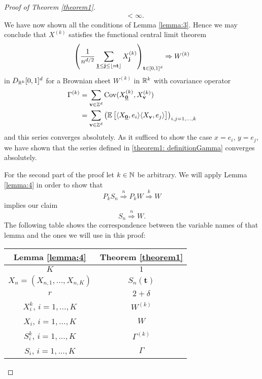 \begin{proof}[Proof of Theorem \ref{theorem1}]
\begin{align*}
        & < \infty.
    \end{align*}
    We have now shown all the conditions of Lemma \ref{lemma:3}. Hence we may conclude that $X^{(k)}$ satisfies the functional central limit theorem
    \[ \left( \frac{1}{n^{d/2}} \sum\limits_{\usbf[1] \leq \mathbf{j} \leq \floor{n \mathbf{t}}} X^{(k)}_\mathbf{j} \right)_{\mathbf{t} \in [0,1]^d} \Rightarrow W^{(k)} \]
    in $D_{\mathbb{R}^k}[0,1]^d$ for a Brownian sheet $W^{(k)}$ in $\mathbb{R}^k$ with covariance operator
    \begin{align*}
        \Gamma^{(k)}
        & = \sum\limits_{\mathbf{v} \in \ZZ^d} \Cov(X^{(k)}_{\usbf[0]}, X^{(k)}_{\mathbf{v}}) \\
        & = \sum\limits_{\mathbf{v} \in \ZZ^d} \left(\EE{\langle X_{\usbf[0]}, e_i \rangle \langle X_\mathbf{v}, e_j \rangle}\right)_{i,j=1, ..., k}
    \end{align*}
    and this series converges absolutely. As it sufficed to show the case $x = e_i$, $y = e_j$, we have shown that the series defined in \eqref{theorem1: definitionGamma} converges absolutely.

    For the second part of the proof let $k \in \mathbb{N}$ be arbitrary. We will apply Lemma \ref{lemma:4} in order to show that
    \[ P_k S_n \stackrel{n}{\Rightarrow} P_k W \stackrel{k}{\Rightarrow} W \]
    implies our claim
    \[ S_n \stackrel{n}{\Rightarrow} W. \]
    The following table shows the correspondence between the variable names of that lemma and the ones we will use in this proof:
    \begin{center}
        \begin{tabular}{|c | c|} 
         \hline
         Lemma \ref{lemma:4} & Theorem \ref{theorem1} \\ [0.5ex] 
         \hline\hline
         $K$ & $1$ \\ 
         \hline
         $X_n = (X_{n, 1}, ..., X_{n, K})$ & $S_n(\mathbf{t})$ \\
         \hline
         $r$ & $2+\delta$ \\
         \hline
         $X_i^k$, $i = 1, ..., K$ & $W^{(k)}$ \\ 
         \hline
         $X_i$, $i = 1, ..., K$ & $W$ \\ 
         \hline
         $S_i^k$, $i = 1, ..., K$ & $\Gamma^{(k)}$ \\ 
         \hline
         $S_i$, $i = 1, ..., K$ & $\Gamma$ \\  %
         \hline
        \end{tabular}
    \end{center}


\end{proof}
